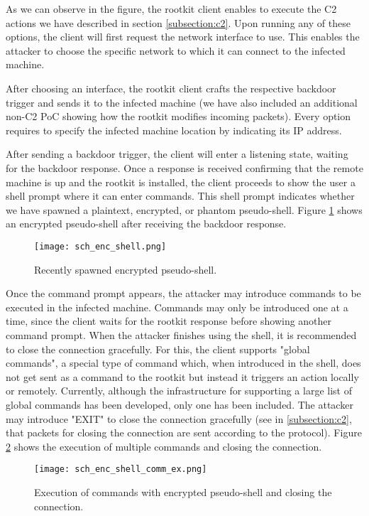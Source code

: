 As we can observe in the figure, the rootkit client enables to execute the C2 actions we have described in section \ref{subsection:c2}. Upon running any of these options, the client will first request the network interface to use. This enables the attacker to choose the specific network to which it can connect to the infected machine.

After choosing an interface, the rootkit client crafts the respective backdoor trigger and sends it to the infected machine (we have also included an additional non-C2 PoC showing how the rootkit modifies incoming packets). Every option requires to specify the infected machine location by indicating its IP address.

After sending a backdoor trigger, the client will enter a listening state, waiting for the backdoor response. Once a response is received confirming that the remote machine is up and the rootkit is installed, the client proceeds to show the user a shell prompt where it can enter commands. This shell prompt indicates whether we have spawned a plaintext, encrypted, or phantom pseudo-shell. Figure \ref{fig:enc_shell} shows an encrypted pseudo-shell after receiving the backdoor response.

\begin{figure}[htbp]
	\centering
	\texttt{[image: sch\_enc\_shell.png]}
	\caption{Recently spawned encrypted pseudo-shell.}
	\label{fig:enc_shell}
\end{figure}

Once the command prompt appears, the attacker may introduce commands to be executed in the infected machine. Commands may only be introduced one at a time, since the client waits for the rootkit response before showing another command prompt. When the attacker finishes using the shell, it is recommended to close the connection gracefully. For this, the client supports "global commands", a special type of command which, when introduced in the shell, does not get sent as a command to the rootkit but instead it triggers an action locally or remotely. Currently, although the infrastructure for supporting a large list of global commands has been developed, only one has been included. The attacker may introduce "EXIT" to close the connection gracefully (see in \ref{subsection:c2}, that packets for closing the connection are sent according to the protocol). Figure \ref{fig:enc_shell_comm_ex} shows the execution of multiple commands and closing the connection.

\begin{figure}[htbp]
	\centering
	\texttt{[image: sch\_enc\_shell\_comm\_ex.png]}
	\caption{Execution of commands with encrypted pseudo-shell and closing the connection.}
	\label{fig:enc_shell_comm_ex}
\end{figure}

